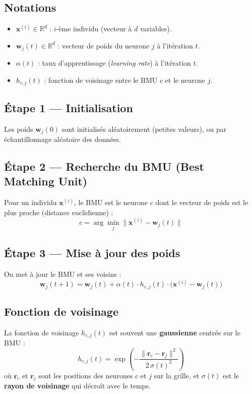 \documentclass[a4paper,11pt]{article}
\theoremstyle{definition}
\begin{document}
\subsection{Notations}

\begin{itemize}
    \item $\mathbf{x}^{(i)} \in \mathbb{R}^d$ : $i$-ème individu (vecteur à $d$ variables).
    \item $\mathbf{w}_j(t) \in \mathbb{R}^d$ : vecteur de poids du neurone $j$ à l'itération $t$.
    \item $\alpha(t)$ : taux d'apprentissage (\textit{learning rate}) à l'itération $t$.
    \item $h_{c,j}(t)$ : fonction de voisinage entre le BMU $c$ et le neurone $j$.
\end{itemize}

\subsection{Étape 1 — Initialisation}
Les poids $\mathbf{w}_j(0)$ sont initialisés aléatoirement (petites valeurs), ou par échantillonnage aléatoire des données.

\subsection{Étape 2 — Recherche du BMU (Best Matching Unit)}
Pour un individu $\mathbf{x}^{(i)}$, le BMU est le neurone $c$ dont le vecteur de poids est le plus proche (distance euclidienne) :
\[
c = \arg\min_{j} \|\mathbf{x}^{(i)} - \mathbf{w}_j(t)\|
\]

\subsection{Étape 3 — Mise à jour des poids}
On met à jour le BMU et ses voisins :
\[
\boxed{\mathbf{w}_j(t+1) = \mathbf{w}_j(t) + \alpha(t) \cdot h_{c,j}(t) \cdot \bigl(\mathbf{x}^{(i)} - \mathbf{w}_j(t)\bigr)}
\]

\subsection{Fonction de voisinage}
La fonction de voisinage $h_{c,j}(t)$ est souvent une \textbf{gaussienne} centrée sur le BMU :
\[
h_{c,j}(t) = \exp\!\left(-\frac{\| \mathbf{r}_c - \mathbf{r}_j \|^2}{2\,\sigma(t)^2}\right)
\]
où $\mathbf{r}_c$ et $\mathbf{r}_j$ sont les positions des neurones $c$ et $j$ sur la grille, et $\sigma(t)$ est le \textbf{rayon de voisinage} qui décroît avec le temps.
\end{document}
